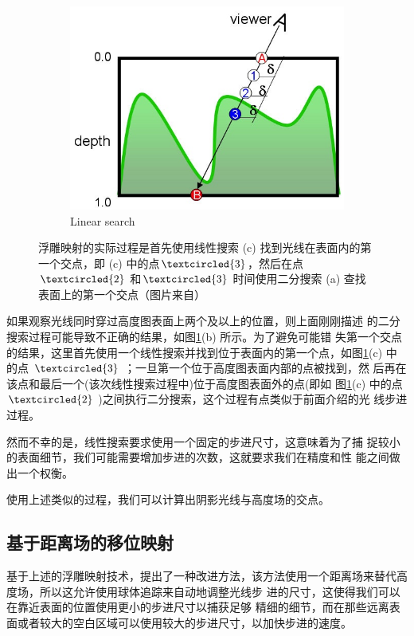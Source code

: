 \begin{figure}
\begin{fullwidth}
\begin{subfigure}[t]{.33\thewidth}
		\includegraphics[width=\textwidth]{graphics/df/relief-mapping3}
		\caption{Linear search}
	\end{subfigure}
	\caption{浮雕映射的实际过程是首先使用线性搜索 (c) 找到光线在表面内的第一个交点，即 (c) 中的点$\textcircled{3}$，然后在点$\textcircled{2}$ 和$\textcircled{3}$ 时间使用二分搜索 (a) 查找表面上的第一个交点（图片来自\cite{a:Real-TimeReliefMappingonArbitraryPolygonalSurfaces}）}
	\label{f:df-relief-mapping}
\end{fullwidth}
\end{figure}

如果观察光线同时穿过高度图表面上两个及以上的位置，则上面刚刚描述 的二分搜索过程可能导致不正确的结果，如图\ref{f:df-relief-mapping}(b) 所示。为了避免可能错 失第一个交点的结果，这里首先使用一个线性搜索并找到位于表面内的第一个点，如图\ref{f:df-relief-mapping}(c) 中的点 $\textcircled{3}$ ；一旦第一个位于高度图表面内部的点被找到，然 后再在该点和最后一个(该次线性搜索过程中)位于高度图表面外的点(即如 图\ref{f:df-relief-mapping}(c) 中的点 $\textcircled{2}$ )之间执行二分搜索，这个过程有点类似于前面介绍的光 线步进过程。

然而不幸的是，线性搜索要求使用一个固定的步进尺寸，这意味着为了捕 捉较小的表面细节，我们可能需要增加步进的次数，这就要求我们在精度和性 能之间做出一个权衡。

使用上述类似的过程，我们可以计算出阴影光线与高度场的交点。



\subsection{基于距离场的移位映射}
基于上述的浮雕映射技术，\cite{a:Per-PixelDisplacementMappingwithDistanceFunctions}提出了一种改进方法，该方法使用一个距离场来替代高度场，所以这允许使用球体追踪来自动地调整光线步 进的尺寸，这使得我们可以在靠近表面的位置使用更小的步进尺寸以捕获足够 精细的细节，而在那些远离表面或者较大的空白区域可以使用较大的步进尺寸，以加快步进的速度。

